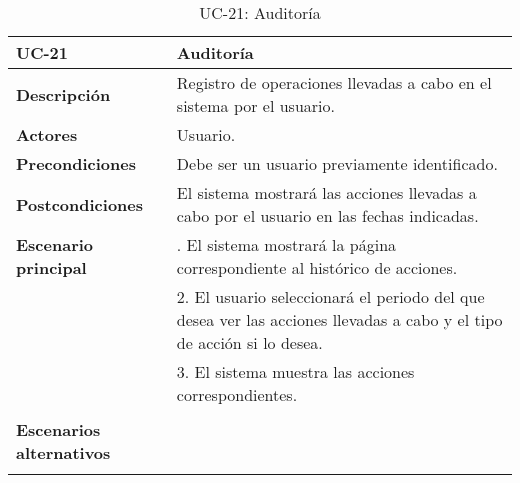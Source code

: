 \begin{table}[H]
  \begin{center}
    \begin{tabularx}{16.4cm}{|l|X|}
      \hline
      \textbf{UC-21} & \textbf{Auditoría}\\
      \hline
      \textbf{Descripción} & Registro de operaciones llevadas a cabo en el sistema por el usuario.\\
      \hline
      \textbf{Actores} & Usuario.\\
      \hline
      \textbf{Precondiciones} & Debe ser un usuario previamente identificado.\\
      \hline
      \textbf{Postcondiciones} & El sistema mostrará las acciones llevadas a cabo por el usuario en las fechas indicadas.\\
      \hline
      \textbf{Escenario principal} & \smallskip 1. El sistema mostrará la página correspondiente al histórico de acciones.\\
      & 2. El usuario seleccionará el periodo del que desea ver las acciones llevadas a cabo y el tipo de acción si lo desea.\\
      & 3. El sistema muestra las acciones correspondientes.\\
      & \\
      \hline
      \textbf{Escenarios alternativos} & \\
      & \\
      \hline
    \end{tabularx}
    \caption{UC-21: Auditoría}
  \end{center}
\end{table}


